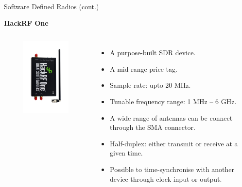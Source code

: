 \documentclass[handout]{beamer}
\begin{document}
\begin{frame}{Software Defined Radios (cont.)}  

\footnotesize
\textbf{HackRF One}

\begin{columns}


	\begin{figure}
		\includegraphics[width=120pt]{figures/hackrf-one.jpg}
	\end{figure}


	\begin{itemize}
	\footnotesize
	\item A purpose-built SDR device.
		\vspace{5pt}
	\item A mid-range price tag.
		\vspace{5pt}
	\item Sample rate: upto 20 MHz.
		\vspace{5pt}
	\item Tunable frequency range: 1 MHz -- 6 GHz.
		\vspace{5pt}
	\item A wide range of antennas can be connect through the SMA connector.
		\vspace{5pt}
	\item Half-duplex: either transmit or receive at a given time.
		\vspace{5pt}
	\item Possible to time-synchronise with another device through clock input or output.
	\end{itemize}


\end{columns}

\end{frame}
\end{document}
